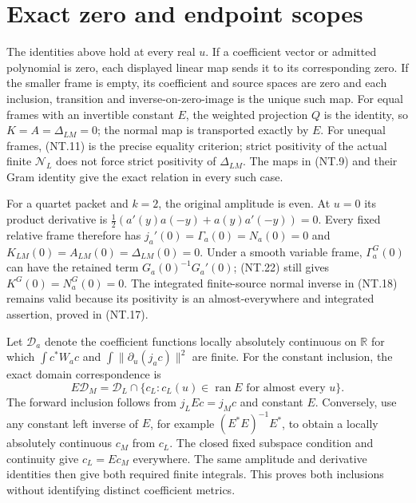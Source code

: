 \documentclass[11pt]{article}
\newcommand{\ran}{\operatorname{ran}}
\begin{document}
\section{Exact zero and endpoint scopes}

The identities above hold at every real $u$. If a coefficient
vector or admitted polynomial is zero, each displayed linear map
sends it to its corresponding zero. If the smaller frame is empty,
its coefficient and source spaces are zero and each inclusion,
transition and inverse-on-zero-image is the unique such map.
For equal frames with an invertible constant $E$, the weighted
projection $Q$ is the identity, so $K=A=\Delta_{LM}=0$;
the normal map is transported exactly by $E$.
For unequal frames, (NT.11) is the precise equality criterion;
strict positivity of the actual finite $\mathcal N_L$ does not
force strict positivity of $\Delta_{LM}$. The maps in (NT.9)
and their Gram identity give the exact relation in every such case.

For a quartet packet and $k=2$, the original amplitude is even.
At $u=0$ its product derivative is
$\tfrac12(a'(y)a(-y)+a(y)a'(-y))=0$.
Every fixed relative frame therefore has
$j_a'(0)=\Gamma_a(0)=N_a(0)=0$ and
$K_{LM}(0)=A_{LM}(0)=\Delta_{LM}(0)=0$.
Under a smooth variable frame, $\Gamma_a^G(0)$ can have the
retained term $G_a(0)^{-1}G_a'(0)$; (NT.22) still gives
$K^G(0)=N_a^G(0)=0$. The integrated finite-source normal inverse
in (NT.18) remains valid because its positivity is an
almost-everywhere and integrated assertion, proved in (NT.17).

Let $\mathcal D_a$ denote the coefficient functions locally
absolutely continuous on $\mathbb R$ for which
$\int c^*W_ac$ and $\int\|\partial_u(j_ac)\|^2$ are finite.
For the constant inclusion, the exact domain correspondence is
\[
 E\mathcal D_M=\mathcal D_L\cap
 \{c_L:c_L(u)\in\ran E\text{ for almost every }u\}.
 \tag{NT.29}
\]
The forward inclusion follows from $j_LEc=j_Mc$ and constant
$E$. Conversely, use any constant left inverse of $E$, for example
$(E^*E)^{-1}E^*$, to obtain a locally absolutely continuous
$c_M$ from $c_L$. The closed fixed subspace condition and continuity
give $c_L=Ec_M$ everywhere. The same amplitude and derivative
identities then give both required finite integrals. This proves
both inclusions without identifying distinct coefficient metrics.
\end{document}
